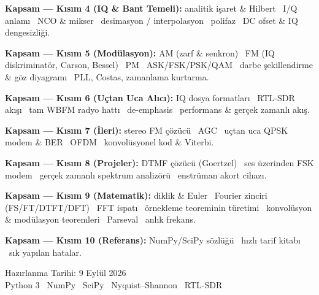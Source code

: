 \documentclass[11pt,a4paper]{article}
\begin{document}
\begin{titlepage}
\begin{center}
{{\textbf{Kapsam --- Kısım 4 (IQ \& Bant Temeli):} analitik işaret \& Hilbert
\textbullet\ I/Q anlamı \textbullet\ NCO \& mikser \textbullet\ desimasyon /
interpolasyon \textbullet\ polifaz \textbullet\ DC ofset \& IQ dengesizliği.\vspace{3pt}

\textbf{Kapsam --- Kısım 5 (Modülasyon):} AM (zarf \& senkron) \textbullet\ FM
(IQ diskriminatör, Carson, Bessel) \textbullet\ PM \textbullet\ ASK/FSK/PSK/QAM
\textbullet\ darbe şekillendirme \& göz diyagramı \textbullet\ PLL, Costas,
zamanlama kurtarma.\vspace{3pt}

\textbf{Kapsam --- Kısım 6 (Uçtan Uca Alıcı):} IQ dosya formatları
\textbullet\ RTL-SDR akışı \textbullet\ tam WBFM radyo hattı \textbullet\
de-emphasis \textbullet\ performans \& gerçek zamanlı akış.\vspace{3pt}

\textbf{Kapsam --- Kısım 7 (İleri):} stereo FM çözücü \textbullet\ AGC
\textbullet\ uçtan uca QPSK modem \& BER \textbullet\ OFDM \textbullet\
konvolüsyonel kod \& Viterbi.\vspace{3pt}

\textbf{Kapsam --- Kısım 8 (Projeler):} DTMF çözücü (Goertzel) \textbullet\
ses üzerinden FSK modem \textbullet\ gerçek zamanlı spektrum analizörü
\textbullet\ enstrüman akort cihazı.\vspace{3pt}

\textbf{Kapsam --- Kısım 9 (Matematik):} diklik \& Euler \textbullet\ Fourier
zinciri (FS/FT/DTFT/DFT) \textbullet\ FFT ispatı \textbullet\ örnekleme
teoreminin türetimi \textbullet\ konvolüsyon \& modülasyon teoremleri
\textbullet\ Parseval \textbullet\ anlık frekans.\vspace{3pt}

\textbf{Kapsam --- Kısım 10 (Referans):} NumPy/SciPy sözlüğü \textbullet\
hızlı tarif kitabı \textbullet\ sık yapılan hatalar.\vspace{3pt}}}
\end{center}

\vfill
{\color{ortaGri}\large Hazırlanma Tarihi: 9 Eylül 2026}\\[4pt]
{\color{ortaGri} Python 3 \textbullet\ NumPy \textbullet\ SciPy \textbullet\ Nyquist--Shannon \textbullet\ RTL-SDR}
\vspace*{0.4cm}
\end{titlepage}

\tableofcontents
\thispagestyle{empty}
\clearpage
\end{document}
